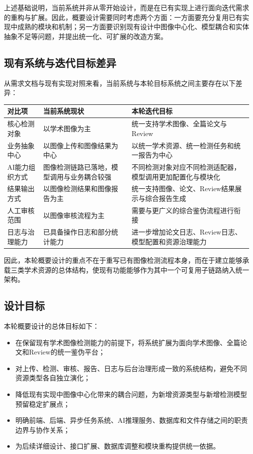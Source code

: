 上述基础说明，当前系统并非从零开始设计，而是在已有实现上进行面向迭代需求的重构与扩展。因此，概要设计需要同时考虑两个方面：一方面要充分复用已有实现中成熟的模块和机制；另一方面要识别现有设计中图像中心化、模型耦合和实体抽象不足等问题，并提出统一化、可扩展的改造方案。

\subsection{现有系统与迭代目标差异}
从需求文档与现有实现对照来看，当前系统与本轮目标系统之间主要存在以下差异：
\begin{longtable}{|p{3.8cm}|p{4.8cm}|p{5.4cm}|}
\hline
对比项 & 当前系统现状 & 本轮迭代目标 \\ \hline
核心检测对象 & 以学术图像为主 & 统一支持学术图像、全篇论文与Review \\ \hline
业务抽象中心 & 以图像上传和图像结果为中心 & 以统一学术资源、统一检测任务和统一报告为中心 \\ \hline
AI能力组织方式 & 图像检测链路已落地，模型调用与业务耦合较强 & 不同检测对象对应不同检测适配器，模型调用更加配置化与模块化 \\ \hline
结果输出方式 & 以图像检测结果和图像报告为主 & 统一支持图像、论文、Review结果展示与综合报告生成 \\ \hline
人工审核范围 & 以图像审核流程为主 & 需要与更广义的综合鉴伪流程进行衔接 \\ \hline
日志与治理能力 & 已具备操作日志和部分统计能力 & 进一步增加论文日志、Review日志、模型配置和资源治理能力 \\ \hline
\end{longtable}

因此，本轮概要设计的重点不在于重写已有图像检测流程本身，而在于建立能够承载三类学术资源的总体结构，使现有功能能够作为其中一个可复用子链路纳入统一架构。

\subsection{设计目标}
本轮概要设计的总体目标如下：
\begin{itemize}[leftmargin=2em]
    \item 在保留现有学术图像检测能力的前提下，将系统扩展为面向学术图像、全篇论文和Review的统一鉴伪平台；
    \item 对上传、检测、审核、报告、日志与后台治理形成一致的系统结构，避免不同资源类型各自独立演化；
    \item 降低现有实现中图像中心化带来的耦合问题，为新增资源类型与新增检测模型预留稳定扩展点；
    \item 明确前端、后端、异步任务系统、AI推理服务、数据库和文件存储之间的职责边界与协作关系；
    \item 为后续详细设计、接口扩展、数据库调整和模块重构提供统一依据。
\end{itemize}

